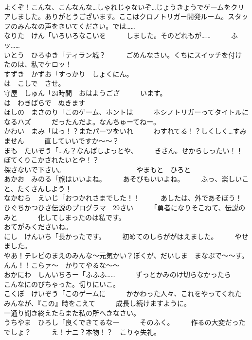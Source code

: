 \documentclass[8pt]{extreport}
\begin{document}
\begin{CJK}{UTF8}{min}
\\	よくぞ！こんな、こんなんな…しゃれじゃないぞ…じょうきょうでゲームをクリアしました。ありがとうございます。ここはクロノトリガー開発ルーム。スタッフのみんなの声をきいてください。では……	
\\	なりた　けん「いろいろなこいを　　　しました。そのどれもが……　　　ふッ……	
\\	いとう　ひろゆき「ティラン城？　　　ごめんなさい。くちにスイッチを付け　　　たのは、私でケロッ！	
\\	すずき　かずお「すっかり　しょくにん。　　　
\\	は　こしで　させ。	
\\	守屋　しゅん「24時間　おはようござ　　　います。　　　
\\	は　わきばらで　ぬきます	
\\	ほしの　まさのり「このゲーム、ホントは　　　ホシノトリガーってタイトルになるハズ　　　だったんだよ。なんちゅーてねー。	
\\	かわい　まみ「はっ！？またパーツをいれ　　　わすれてる！？しくしく…すみません　　　直していいですか～～？	
\\	まも　たいぞう「…ん？なんばしよっとや、　　　きさん。せからしったい！！　　　ぼてくりこかされたいとや！？	
\\	探さないで下さい。　　　　　　　　　　　やまもと　ひろと	
\\	あかお　みのる「旅はいいよね。　　　あそびもいいよね。　　　ふっ、楽しいこと、たくさんしよう！	
\\	なかむら　えいじ「おつかれさまでした！！　　　あしたは、外であそぼう！	
\\	ひぐちかつひさ伝説のプログラマ　29さい　　　「勇者になりそこねて、伝説のみと　　　化してしまったのは私です。	
\\	おてがみくださいね。	
\\	にし　けんいち「長かったです。　　　初めてのしらががはえました。　　　やせました。	
\\	やあ！テレビのまえのみんな～元気かい？ぼくが、だいしま　まなぶで～～す。んん！！こらァ～　かりてやるな～～	
\\	おかにわ　しんいちろー「ふふふ……　　　ずっとかみのけ切らなかったら　　　こんなにのびちゃった。切りにいこ。	
\\	こくぼ　けいぞう「このゲームに　　　かかわった人々、これをやってくれた　　　みんなが、『この』時をこえて　　　成長し続けますように。	
\\	一通り聞き終えたらまた私の所へきなさい。	
\\	うちやま　ひろし「良くできてるなー　　　そのふく。　　　作るの大変だったでしょ？　　　え！ナニ？本物！？　こりゃ失礼。	

\end{CJK}
\end{document}
